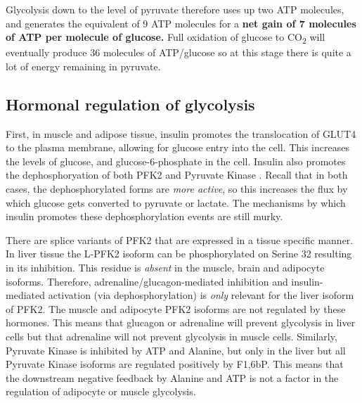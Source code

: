 \documentclass{tufte-handout}
\begin{document}
Glycolysis down to the level of pyruvate therefore uses up two ATP molecules, and generates the equivalent of 9 ATP molecules for a \textbf{net gain of 7 molecules of ATP per molecule of glucose.}  Full oxidation of glucose to CO\textsubscript{2} will eventually produce 36 molecules of ATP/glucose so at this stage there is quite a lot of energy remaining in pyruvate.

\subsection{Hormonal regulation of glycolysis}

  First, in muscle and adipose tissue, insulin promotes the translocation of GLUT4 to the plasma membrane, allowing for glucose entry into the cell.  This increases the levels of glucose, and glucose-6-phosphate in the cell.  Insulin also promotes the dephosphoryation of both PFK2 and Pyruvate Kinase \citep{PROBST1985}. Recall that in both cases, the dephosphorylated forms are \emph{more active}, so this increases the flux by which glucose gets converted to pyruvate or lactate.  The mechanisms by which insulin promotes these dephosphorylation events are still murky.

  There are splice variants of PFK2 that are expressed in a tissue specific manner.  In liver tissue the L-PFK2 isoform can be phosphorylated on Serine 32 resulting in its inhibition.  This residue is \emph{absent} in the muscle, brain and adipocyte isoforms.  Therefore, adrenaline/glucagon-mediated inhibition and insulin-mediated activation (via dephosphorylation) is \emph{only} relevant for the liver isoform of PFK2.  The muscle and adipocyte PFK2 isoforms are not regulated by these hormones.  This means that glucagon or adrenaline will prevent glycolysis in liver cells but that adrenaline will not prevent glycolysis in muscle cells.  Similarly, Pyruvate Kinase is inhibited by ATP and Alanine, but only in the liver but all Pyruvate Kinase isoforms are regulated positively by F1,6bP.  This means that the downstream negative feedback by Alanine and ATP is not a factor in the regulation of adipocyte or muscle glycolysis.  
\end{document}
